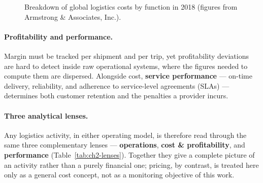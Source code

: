 \begin{figure}[H]
\centering
{}
\caption{Breakdown of global logistics costs by function in 2018 (figures from Armstrong \&
Associates, Inc.).}
\label{fig:ch2-cost-structure}
\end{figure}

\paragraph{Profitability and performance.}
Margin must be tracked per shipment and per trip, yet profitability deviations are hard to detect
inside raw operational systems, where the figures needed to compute them are dispersed. Alongside cost,
\textbf{service performance} --- on-time delivery, reliability, and adherence to service-level
agreements (SLAs) --- determines both customer retention and the penalties a provider incurs.

\paragraph{Three analytical lenses.}
Any logistics activity, in either operating model, is therefore read through the same three
complementary lenses --- \textbf{operations}, \textbf{cost \& profitability}, and \textbf{performance}
(Table~\ref{tab:ch2-lenses}). Together they give a complete picture of an activity rather than a purely
financial one; pricing, by contrast, is treated here only as a general cost concept, not as a
monitoring objective of this work.

